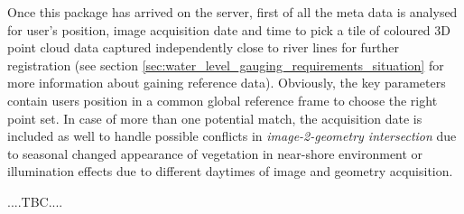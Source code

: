 \documentclass[review]{elsarticle}
\begin{document}
Once this package has arrived on the server, first of all the meta data is analysed for user's position, image acquisition date and time to pick a tile of coloured 3D point cloud data captured independently close to river lines for further registration (see section \ref{sec:water_level_gauging_requirements_situation} for more information about gaining reference data). Obviously, the key parameters contain users position in a common global reference frame to choose the right point set. In case of more than one potential match, the acquisition date is included as well to handle possible conflicts in \textit{image-2-geometry intersection} due to seasonal changed appearance of vegetation in near-shore environment or illumination effects due to different daytimes of image and geometry acquisition.

....TBC.... 
\end{document}

